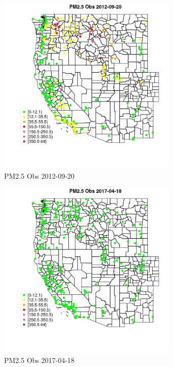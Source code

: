 \begin{figure} 
\centering  
\includegraphics[width=0.77\textwidth]{Code_Outputs/Report_ML_input_PM25_Step4_part_e_de_duplicated_aves_compiled_2019-05-14wNAs_MapObsPM25_Obs2012-09-20.jpg} 
\caption{\label{fig:Report_ML_input_PM25_Step4_part_e_de_duplicated_aves_compiled_2019-05-14wNAsMapObsPM25_Obs2012-09-20}PM2.5 Obs 2012-09-20} 
\end{figure} 
 

\clearpage 

\begin{figure} 
\centering  
\includegraphics[width=0.77\textwidth]{Code_Outputs/Report_ML_input_PM25_Step4_part_e_de_duplicated_aves_compiled_2019-05-14wNAs_MapObsPM25_Obs2017-04-18.jpg} 
\caption{\label{fig:Report_ML_input_PM25_Step4_part_e_de_duplicated_aves_compiled_2019-05-14wNAsMapObsPM25_Obs2017-04-18}PM2.5 Obs 2017-04-18} 
\end{figure} 
 

